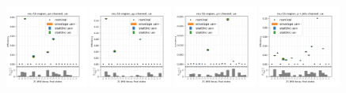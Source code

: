 \begin{figure}
    \centering
    \includegraphics[width=0.24\textwidth]{appendices/ttSystReweighting/figures/afterCorr/icata0_ch0_ue.png}
    \includegraphics[width=0.24\textwidth]{appendices/ttSystReweighting/figures/afterCorr/icata0_ch1_ue.png}
    \includegraphics[width=0.24\textwidth]{appendices/ttSystReweighting/figures/afterCorr/icata0_ch2_ue.png}
    \includegraphics[width=0.24\textwidth]{appendices/ttSystReweighting/figures/afterCorr/icata0_ch3_ue.png}


\end{figure}
